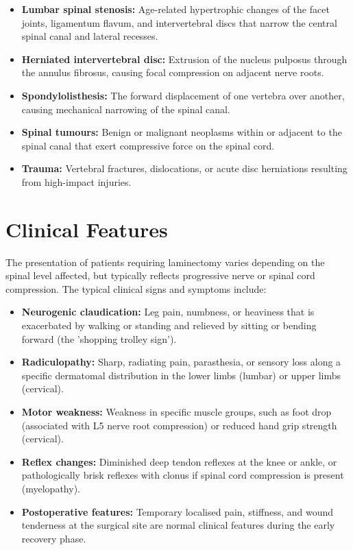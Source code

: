 \begin{itemize}
    \item \textbf{Lumbar spinal stenosis:} Age-related hypertrophic changes of the facet joints, ligamentum flavum, and intervertebral discs that narrow the central spinal canal and lateral recesses.
    \item \textbf{Herniated intervertebral disc:} Extrusion of the nucleus pulposus through the annulus fibrosus, causing focal compression on adjacent nerve roots.
    \item \textbf{Spondylolisthesis:} The forward displacement of one vertebra over another, causing mechanical narrowing of the spinal canal.
    \item \textbf{Spinal tumours:} Benign or malignant neoplasms within or adjacent to the spinal canal that exert compressive force on the spinal cord.
    \item \textbf{Trauma:} Vertebral fractures, dislocations, or acute disc herniations resulting from high-impact injuries.
\end{itemize}

\section*{Clinical Features}
The presentation of patients requiring laminectomy varies depending on the spinal level affected, but typically reflects progressive nerve or spinal cord compression. The typical clinical signs and symptoms include:

\begin{itemize}
    \item \textbf{Neurogenic claudication:} Leg pain, numbness, or heaviness that is exacerbated by walking or standing and relieved by sitting or bending forward (the 'shopping trolley sign').
    \item \textbf{Radiculopathy:} Sharp, radiating pain, parasthesia, or sensory loss along a specific dermatomal distribution in the lower limbs (lumbar) or upper limbs (cervical).
    \item \textbf{Motor weakness:} Weakness in specific muscle groups, such as foot drop (associated with L5 nerve root compression) or reduced hand grip strength (cervical).
    \item \textbf{Reflex changes:} Diminished deep tendon reflexes at the knee or ankle, or pathologically brisk reflexes with clonus if spinal cord compression is present (myelopathy).
    \item \textbf{Postoperative features:} Temporary localised pain, stiffness, and wound tenderness at the surgical site are normal clinical features during the early recovery phase.
\end{itemize}

